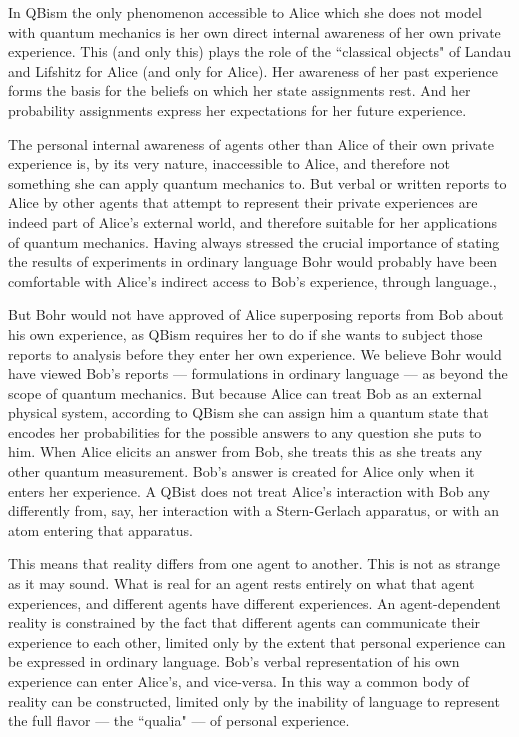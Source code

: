 \documentclass[aps,prb,superscriptaddress,12pt,tightenlines,nofootinbib]{revtex4-2}
\begin{document}
In QBism the only phenomenon accessible to Alice which she does not model with quantum mechanics is her own direct internal awareness of her own private experience.  This (and only this) plays the role of the ``classical objects" of Landau and Lifshitz for Alice (and only for Alice).   Her awareness of her past  experience forms the basis for the beliefs on which her state assignments rest.     And her probability assignments express her expectations for her future experience.

The personal  internal awareness of agents other than Alice of their own private experience is, by its very nature, inaccessible to Alice, and therefore not something she can apply quantum mechanics to.  But verbal or written reports to Alice by other agents that attempt to represent their private experiences are indeed part of Alice's external world, and therefore suitable for her applications of quantum mechanics.   Having always stressed the crucial importance of stating the results of experiments in ordinary language \cite{Bohr54} Bohr would probably have been comfortable with Alice's indirect access to Bob's experience, through language.,

But Bohr would not have approved of Alice superposing reports from Bob about his own experience, as QBism requires her to do if she wants to subject those reports to analysis before they enter her own experience.   We believe Bohr would have viewed Bob's reports --- formulations in ordinary language --- as beyond the scope of quantum mechanics.   But because Alice can treat Bob as an external physical system, according to QBism she can assign him a quantum state that encodes her probabilities for the possible answers to any question she puts to him.   When Alice elicits an answer from Bob, she treats this as she treats any other  quantum measurement.     Bob's answer is created for Alice only when it enters her experience. A QBist  does not treat Alice's interaction with Bob any differently from, say, her interaction with a Stern-Gerlach apparatus, or with an atom entering that apparatus.

This means that reality differs from one agent to another.   This is not as strange as it may sound.     What is real for an agent rests entirely on what that agent experiences, and different agents have different experiences.   An agent-dependent reality is constrained by the fact that  different agents can communicate their experience to each other, limited only by the extent that personal experience can be expressed in ordinary language.   Bob's verbal representation of his own experience can enter Alice's, and vice-versa.   In this way a common body of reality can be constructed, limited only by the inability of language to represent the full flavor --- the ``qualia" --- of personal experience.
\end{document}
